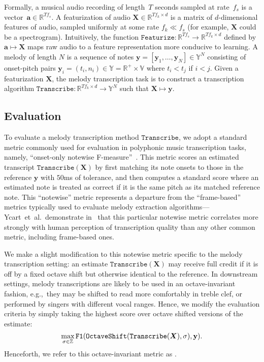 Formally, a musical audio recording of length~$T$ seconds sampled at rate~$f_s$ is a vector~${\bm{a} \in \mathbb{R}^{Tf_s}}$. 
A featurization of audio ${\bm{X} \in \mathbb{R}^{Tf_k \times d}}$ is a matrix of $d$-dimensional features of audio, sampled uniformly at some rate ${f_k \ll f_s}$ (for example, $\bm{X}$ could be a spectrogram).
Intuitively, the function ${\texttt{Featurize} : \mathbb{R}^{Tf_s} \to \mathbb{R}^{Tf_k \times d}}$ defined by ${\bm{a} \mapsto \bm{X}}$ maps 
raw audio to a feature representation more conducive to learning. 
A melody of length $N$ is a sequence of notes 
$\bm{y} = [\bm{y}_1,\dots,\bm{y}_N] \in \mathbb{Y}^N$
consisting of onset-pitch pairs ${\bm{y}_i = (t_i,n_i)} \in \mathbb{Y} = \mathbb{R}^+ \times \mathbb{V}$ where ${t_i < t_j}$ if ${i < j}$. Given a featurization $\bm{X}$, the melody transcription task is to construct a transcription algorithm ${\texttt{Transcribe} : \mathbb{R}^{Tf_k \times d} \to \mathbb{Y}^N}$ such that ${\bm{X} \mapsto \bm{y}}$.

\subsection{Evaluation}
\label{sec:eval}

To evaluate a melody transcription method $\texttt{Transcribe}$, 
we adopt a standard metric commonly used for evaluation in polyphonic music transcription tasks, namely,  ``onset-only notewise F-measure''~\cite{ycart2020investigating}. 
This metric scores an estimated transcript $\texttt{Transcribe}(\bm{X})$ by first matching its note onsets to those in the reference $\bm{y}$ with $50$ms of tolerance, and then computes a standard \fone{} score where an estimated note is treated as correct if it is the same pitch as its matched reference note. 
This ``notewise'' metric represents a departure from the ``frame-based'' metrics typically used to evaluate melody extraction algorithms---Ycart~et~al.\ demonstrate in~\cite{ycart2020investigating} that this particular notewise metric correlates more strongly with human perception of transcription quality than any other common metric, including frame-based ones.

We make a slight modification to this notewise metric 
specific to the melody transcription setting: an estimate $\texttt{Transcribe}(\bm{X})$ may receive full credit if it is off by a fixed octave shift but otherwise identical to the reference. 
In downstream settings, melody transcriptions are likely to be used in an octave-invariant fashion, e.g.,~they may be shifted to read more comfortably in treble clef, or performed by singers with different vocal ranges. 
Hence, we modify the evaluation criteria by simply taking the highest score over octave shifted versions of the estimate:
\begin{equation*}
    \max_{\sigma \in \mathbb{Z}} \texttt{\texttt{F1}}(\texttt{OctaveShift}(\texttt{Transcribe}(\mbox{\boldmath{$X$}}), \sigma), \mathbf{y}).
\end{equation*}
Henceforth, we refer to this octave-invariant metric as \fone. 